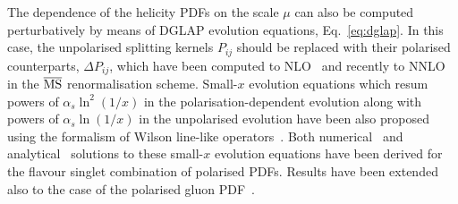 The dependence of the helicity PDFs on the 
scale $\mu$ can also be computed perturbatively by means of DGLAP evolution 
equations, Eq.~\eqref{eq:dglap}.
%
In this case, the unpolarised splitting kernels $P_{ij}$ should be replaced with their
polarised counterparts, $\Delta P_{ij}$, which have been computed to 
NLO~\cite{Mertig:1995ny,Vogelsang:1995vh,Vogelsang:1996im}
and recently to NNLO~\cite{Moch:2014sna} in the $\overline{\rm MS}$ 
renormalisation scheme.
%
Small-$x$ evolution equations which resum powers of $\alpha_s\ln^2(1/x)$
in the polarisation-dependent evolution along with powers of $\alpha_s\ln(1/x)$
in the unpolarised evolution have been also proposed using the formalism
of Wilson line-like operators~\cite{Kovchegov:2015pbl}.
%
Both numerical~\cite{Kovchegov:2016weo}
and analytical~\cite{Kovchegov:2016zex,Kovchegov:2017jxc}
solutions to these small-$x$ evolution equations have been derived
for the flavour singlet combination of polarised PDFs.
%
Results have been extended also to the case of the polarised gluon 
PDF~\cite{Kovchegov:2017lsr}.